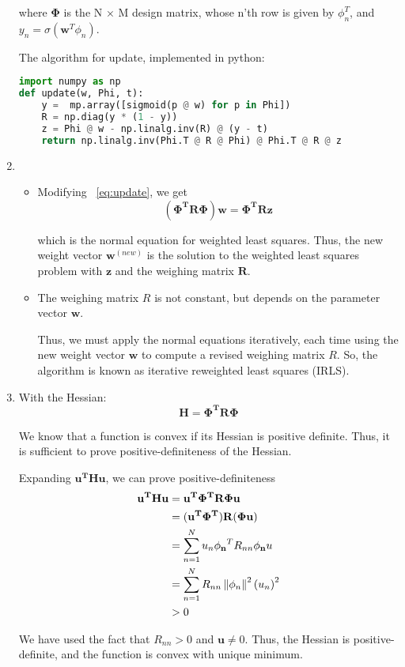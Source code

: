 \documentclass{amsart}
\begin{document}
\begin{enumerate}[label=\textbf{(\Roman*)}]
        where \(\mathbf{\Phi}\) is the N × M design matrix, whose n'th row is given by \(\phi_n^T\), and \(y_n = \sigma(\mathbf{w}^T \phi_n)\).

        The algorithm for update, implemented in python:

        \begin{lstlisting}[language=Python]
import numpy as np
def update(w, Phi, t):
    y =  mp.array([sigmoid(p @ w) for p in Phi])
    R = np.diag(y * (1 - y))
    z = Phi @ w - np.linalg.inv(R) @ (y - t)
    return np.linalg.inv(Phi.T @ R @ Phi) @ Phi.T @ R @ z
        \end{lstlisting}

        \item 
        \begin{itemize}
            \item Modifying ~\ref{eq:update}, we get 
            \[(\mathbf{\Phi^T R \Phi}) \mathbf{w} = \mathbf{\Phi^T R z}\]
    
            which is the normal equation for weighted least squares. Thus, the new weight vector \(\mathbf{w}^{(new)}\) is the solution to the weighted least squares problem with \(\mathbf{z}\) and the weighing matrix \(\mathbf{R}\).
            
            \item The weighing matrix \(R\) is not constant, but depends on the parameter vector \(\mathbf{w}\).
            
            Thus, we must apply the normal equations iteratively, each time using the new weight vector \(\mathbf{w}\) to compute a revised weighing matrix \(R\). So, the algorithm is known as iterative reweighted least squares (IRLS).
        \end{itemize}
        \item 
        With the Hessian: \[\mathbf{H} = \mathbf{\Phi^T R \Phi}\]

        We know that a function is convex if its Hessian is positive definite. Thus, it is sufficient to prove positive-definiteness of the Hessian.

        Expanding \( \mathbf{u^T H u} \), we can prove positive-definiteness \begin{align}
            \begin{split}
                \mathbf{u^T H u} &= \mathbf{u^T \Phi^T R \Phi u} \\
                &= (\mathbf{u^T \Phi^T}) \mathbf{R} (\mathbf{\Phi u}) \\
                &= \sum_{n = 1}^{N} u_n \mathbf{\phi_n}^T R_{nn} \mathbf{\phi_n} u \\
                &= \sum_{n = 1}^{N} R_{nn} \left\lVert\phi_n\right\rVert^2 \left(u_n\right)^2 \\
                &> 0
            \end{split}
        \end{align}

        We have used the fact that \(R_{nn} > 0\) and \(\mathbf{u} \neq 0\). Thus, the Hessian is positive-definite, and the function is convex with unique minimum.


    \end{enumerate}
\end{document}
